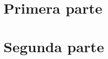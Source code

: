 \documentclass{ugrTFG}
\begin{document}
\maketitle

\frontmatter %








\mainmatter %

\part{Primera parte} %





\cleardoublepage
\part{Segunda parte}



\appendix %


\end{document}
